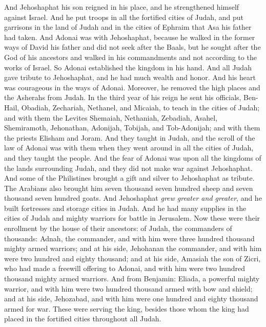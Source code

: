 \begin{biblechapter} %
 And Jehoshaphat his son reigned in his place, and he strengthened himself against Israel.
\verse And he put troops in all the fortified cities of Judah, and put garrisons in the land of Judah and in the cities of Ephraim that Asa his father had taken.
\verse And Adonai was with Jehoshaphat, because he walked in the former ways of David his father and did not seek after the Baals,
\verse but he sought after the God of his ancestors and walked in his commandments and not according to the works of Israel.
\verse So Adonai established the kingdom in his hand. And all Judah gave tribute to Jehoshaphat, and he had much wealth and honor.
\verse And his heart was courageous in the ways of Adonai. Moreover, he removed the high places and the Asherahs from Judah.
\verse In the third year of his reign he sent his officials, Ben-Hail, Obadiah, Zechariah, Nethanel, and Micaiah, to teach in the cities of Judah;
\verse and with them the Levites Shemaiah, Nethaniah, Zebadiah, Asahel, Shemiramoth, Jehonathan, Adonijah, Tobijah, and Tob-Adonijah; and with them the priests Elisham and Joram.
\verse And they taught in Judah, and the scroll of the law of Adonai was with them when they went around in all the cities of Judah, and they taught the people.
\verse And the fear of Adonai was upon all the kingdoms of the lands surrounding Judah, and they did not make war against Jehoshaphat.
\verse And some of the Philistines brought a gift and silver to Jehoshaphat as tribute. The Arabians also brought him seven thousand seven hundred sheep and seven thousand seven hundred goats.
\verse And Jehoshaphat \textit{grew greater and greater}, and he built fortresses and storage cities in Judah.
\verse And he had many supplies in the cities of Judah and mighty warriors for battle in Jerusalem.
\verse Now these were their enrollment by the house of their ancestors: of Judah, the commanders of thousands: Adnah, the commander, and with him were three hundred thousand mighty armed warriors;
\verse and at his side, Jehohanan the commander, and with him were two hundred and eighty thousand;
\verse and at his side, Amasiah the son of Zicri, who had made a freewill offering to Adonai, and with him were two hundred thousand mighty armed warriors.
\verse And from Benjamin: Eliada, a powerful mighty warrior, and with him were two hundred thousand armed with bow and shield;
\verse and at his side, Jehozabad, and with him were one hundred and eighty thousand armed for war.
\verse These were serving the king, besides those whom the king had placed in the fortified cities throughout all Judah.
\end{biblechapter}

